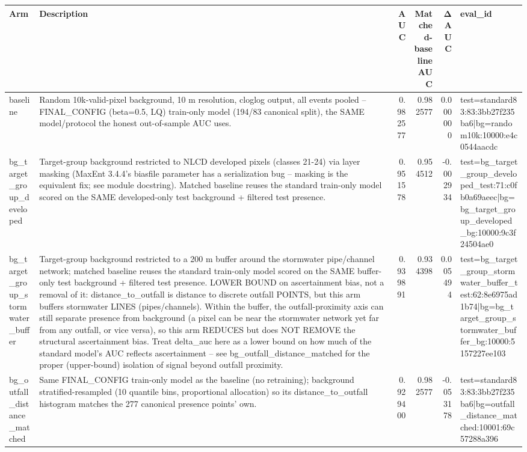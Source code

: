 \begin{tabular}{llrrrl}
\toprule
Arm & Description & AUC & Matched-baseline AUC & ΔAUC & eval\_id \\
\midrule
baseline & Random 10k-valid-pixel background, 10 m resolution, cloglog output, all events pooled -- FINAL\_CONFIG (beta=0.5, LQ) train-only model (194/83 canonical split), the SAME model/protocol the honest out-of-sample AUC uses. & 0.982577 & 0.982577 & 0.000000 & test=standard83:83:3bb27f235ba6|bg=random10k:10000:e4c0544aacdc \\
bg\_target\_group\_developed & Target-group background restricted to NLCD developed pixels (classes 21-24) via layer masking (MaxEnt 3.4.4's biasfile parameter has a serialization bug -- masking is the equivalent fix; see module docstring). Matched baseline reuses the standard train-only model scored on the SAME developed-only test background + filtered test presence. & 0.951578 & 0.954512 & -0.002934 & test=bg\_target\_group\_developed\_test:71:c0fb0a69aeec|bg=bg\_target\_group\_developed\_bg:10000:9c3f24504ae0 \\
bg\_target\_group\_stormwater\_buffer & Target-group background restricted to a 200 m buffer around the stormwater pipe/channel network; matched baseline reuses the standard train-only model scored on the SAME buffer-only test background + filtered test presence. LOWER BOUND on ascertainment bias, not a removal of it: distance\_to\_outfall is distance to discrete outfall POINTS, but this arm buffers stormwater LINES (pipes/channels). Within the buffer, the outfall-proximity axis can still separate presence from background (a pixel can be near the stormwater network yet far from any outfall, or vice versa), so this arm REDUCES but does NOT REMOVE the structural ascertainment bias. Treat delta\_auc here as a lower bound on how much of the standard model's AUC reflects ascertainment -- see bg\_outfall\_distance\_matched for the proper (upper-bound) isolation of signal beyond outfall proximity. & 0.939891 & 0.934398 & 0.005494 & test=bg\_target\_group\_stormwater\_buffer\_test:62:8e6975ad1b74|bg=bg\_target\_group\_stormwater\_buffer\_bg:10000:5157227ee103 \\
bg\_outfall\_distance\_matched & Same FINAL\_CONFIG train-only model as the baseline (no retraining); background stratified-resampled (10 quantile bins, proportional allocation) so its distance\_to\_outfall histogram matches the 277 canonical presence points' own. & 0.929400 & 0.982577 & -0.053178 & test=standard83:83:3bb27f235ba6|bg=outfall\_distance\_matched:10001:69c57288a396 \\

\end{tabular}

